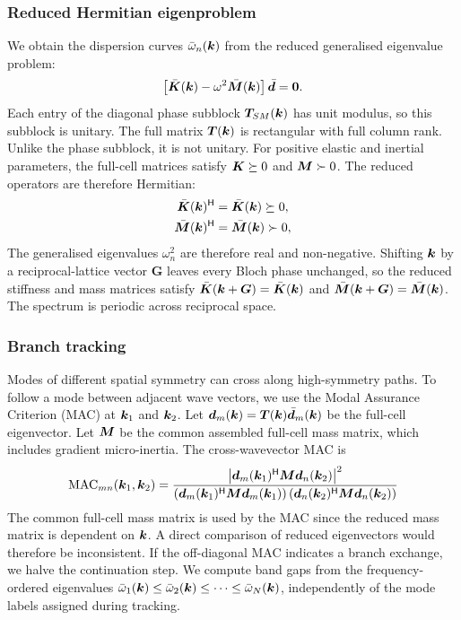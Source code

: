 \subsubsection{Reduced Hermitian eigenproblem}
We obtain the dispersion curves $\bar{\omega}_n(\bm{k})$ from the reduced generalised eigenvalue problem:
\begin{equation}
\left[ \bar{\bm{K}}(\bm{k}) - \omega^2 \bar{\bm{M}}(\bm{k}) \right] \bar{\bm{d}} = \bm{0}.
\label{eq:eigenproblem}
\end{equation}
Each entry of the diagonal phase subblock $\bm{T}_{SM}(\bm{k})$ has unit modulus, so this subblock is unitary. The full matrix $\bm{T}(\bm{k})$ is rectangular with full column rank. Unlike the phase subblock, it is not unitary. For positive elastic and inertial parameters, the full-cell matrices satisfy $\bm{K}\succeq 0$ and $\bm{M}\succ 0$. The reduced operators are therefore Hermitian:
\begin{equation}
\begin{split}
\bar{\bm{K}}(\bm{k})^\mathsf{H} &= \bar{\bm{K}}(\bm{k}) \succeq 0, \\
\bar{\bm{M}}(\bm{k})^\mathsf{H} &= \bar{\bm{M}}(\bm{k}) \succ 0,
\end{split}
\label{eq:hermiticity}
\end{equation}
The generalised eigenvalues $\omega_n^2$ are therefore real and non-negative. Shifting $\bm{k}$ by a reciprocal-lattice vector $\bm{G}$ leaves every Bloch phase unchanged, so the reduced stiffness and mass matrices satisfy $\bar{\bm{K}}(\bm{k} + \bm{G}) = \bar{\bm{K}}(\bm{k})$ and $\bar{\bm{M}}(\bm{k} + \bm{G}) = \bar{\bm{M}}(\bm{k})$. The spectrum is periodic across reciprocal space.

\subsubsection{Branch tracking}
Modes of different spatial symmetry can cross along high-symmetry paths. To follow a mode between adjacent wave vectors, we use the Modal Assurance Criterion (MAC) at $\bm{k}_1$ and $\bm{k}_2$. Let $\bm{d}_m(\bm{k})=\bm{T}(\bm{k})\bar{\bm{d}}_m(\bm{k})$ be the full-cell eigenvector.  Let $\bm{M}$ be the common assembled full-cell mass matrix, which includes gradient micro-inertia. The cross-wavevector MAC is
\begin{equation}
{\small
\mathrm{MAC}_{mn}(\bm{k}_1,\bm{k}_2) = \frac{\left| \bm{d}_m(\bm{k}_1)^\mathsf{H} \bm{M}\bm{d}_n(\bm{k}_2) \right|^2}{\left( \bm{d}_m(\bm{k}_1)^\mathsf{H} \bm{M}\bm{d}_m(\bm{k}_1) \right) \left( \bm{d}_n(\bm{k}_2)^\mathsf{H} \bm{M}\bm{d}_n(\bm{k}_2) \right)}
}
\label{eq:mac_def}
\end{equation}
The common full-cell mass matrix is used by the MAC since the reduced mass matrix is dependent on $\bm{k}$. A direct comparison of reduced eigenvectors would therefore be inconsistent. If the off-diagonal MAC indicates a branch exchange, we halve the continuation step. We compute band gaps from the frequency-ordered eigenvalues $\bar{\omega}_1(\bm{k}) \le \bar{\omega}_2(\bm{k}) \le \dots \le \bar{\omega}_N(\bm{k})$, independently of the mode labels assigned during tracking.
